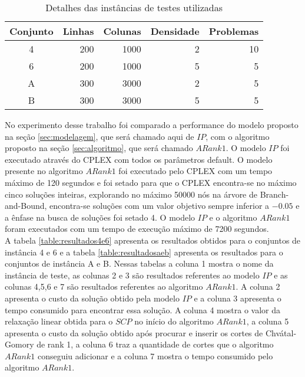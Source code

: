 \begin{table}[htbp]
\begin{center}
  \begin{tabular}{|c|r|r|r|r|}
    \hline
      Conjunto & Linhas   & Colunas & Densidade   & Problemas\\ \hline
      4        & 200      & 1000    & 2           & 10 \\ \hline
      6        & 200      & 1000    & 5           & 5 \\ \hline
      A        & 300      & 3000    & 2           & 5 \\ \hline
      B        & 300      & 3000    & 5           & 5 \\ \hline
  \end{tabular}
\caption{Detalhes das instâncias de testes utilizadas}
\label{table:instancias}
\end{center}
\end{table}
No experimento desse trabalho foi comparado a performance do modelo proposto na seção \ref{sec:modelagem}, que será 
chamado aqui de $IP$, com o algoritmo proposto na seção \ref{sec:algoritmo}, que será chamado $ARank1$.
O modelo $IP$ foi executado através do CPLEX com todos os parâmetros default. O modelo presente no algoritmo $ARank1$
foi executado pelo CPLEX com um tempo máximo de 120 segundos e foi setado para que o CPLEX encontra-se no máximo cinco soluções
inteiras, explorando no máximo 50000 nós na árvore de Branch-and-Bound, encontra-se soluções com um valor objetivo sempre inferior a $-0.05$
e a ênfase na busca de soluções foi setado 4. O modelo $IP$ e o algoritmo $ARank1$ foram executados com um tempo de execução máximo de 7200 segundos. \\
A tabela \ref{table:resultados4e6} apresenta os resultados obtidos para o conjuntos de instância 4 e 6 e a tabela
\ref{table:resultadosaeb} apresenta os resultados para o conjuntos de instância A e B. Nessas tabelas a
coluna 1 mostra o nome da instância de teste, as colunas 2 e 3 são resultados referentes ao modelo $IP$ e as colunas
4,5,6 e 7 são resultados referentes ao algoritmo $ARank1$. A coluna 2 apresenta o custo da solução obtido pela
modelo $IP$ e a coluna 3 apresenta o tempo consumido para encontrar essa solução. A coluna 4 mostra o valor da
relaxação linear obtida para o $SCP$ no início do algoritmo $ARank1$, a coluna 5 apresenta o custo da solução 
obtido após procurar e inserir os cortes de Chvátal-Gomory de rank 1, a coluna 6 traz a quantidade de cortes que o algoritmo
$ARank1$ conseguiu adicionar e a coluna 7 mostra o tempo consumido pelo algoritmo $ARank1$.\\
